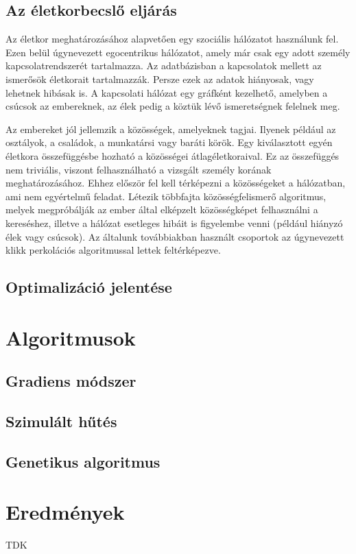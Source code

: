 \documentclass[12pt]{article}
\begin{document}
\subsection{Az életkorbecslő eljárás} %
Az életkor meghatározásához alapvetően egy szociális hálózatot használunk fel. Ezen belül úgynevezett egocentrikus hálózatot, amely már csak egy adott személy kapcsolatrendszerét tartalmazza. Az adatbázisban a kapcsolatok mellett az ismerősök életkorait tartalmazzák. Persze ezek az adatok hiányosak, vagy lehetnek hibásak is. A kapcsolati hálózat egy gráfként kezelhető, amelyben a csúcsok az embereknek, az élek pedig a köztük lévő ismeretségnek felelnek meg.

Az embereket jól jellemzik a közösségek, amelyeknek tagjai. Ilyenek például az osztályok, a családok, a munkatársi vagy baráti körök. Egy kiválasztott egyén életkora összefüggésbe hozható a közösségei átlagéletkoraival. Ez az összefüggés nem triviális, viszont felhasználható a vizsgált személy korának meghatározásához. Ehhez először fel kell térképezni a közösségeket a hálózatban, ami nem egyértelmű feladat. Létezik többfajta közösségfelismerő algoritmus, melyek megpróbálják az ember által elképzelt közösségképet felhasználni a kereséshez, illetve a hálózat esetleges hibáit is figyelembe venni (például hiányzó élek vagy csúcsok). Az általunk továbbiakban használt csoportok az úgynevezett klikk perkolációs algoritmussal \cite{tamas_gabor_tdk} lettek feltérképezve.
\subsection{Optimalizáció jelentése}
\section{Algoritmusok}
\subsection{Gradiens módszer}
\subsection{Szimulált hűtés}
\subsection{Genetikus algoritmus}
\section{Eredmények}
\begin{thebibliography}{9}
	TDK %
\end{thebibliography}
\end{document}

